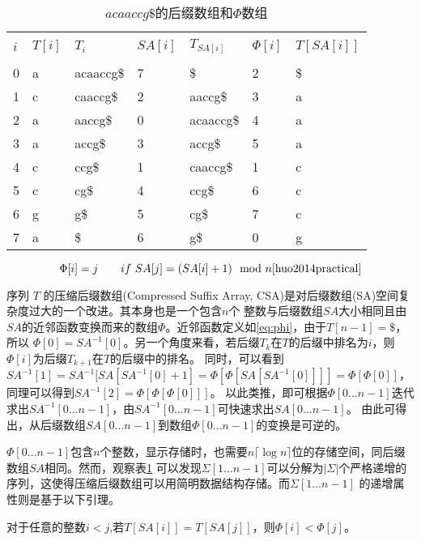 \begin{table}[htbp]
    \caption{$acaaccg\$$的后缀数组和$\Phi$数组}
    \label{tab:tabsuffix}
    \centering
    \begin{tabular}{lllllll}
        \hline\\
        $i$&$T[i]$&$T_i$&$SA[i]$&$T_{SA[i]}$&$\Phi[i]$&$T[SA[i]]$\\
        \hline\\
        0&a&acaaccg\$&7&\$&2&\$\\
        1&c&caaccg\$&2&aaccg\$&3&a\\
        2&a&aaccg\$&0&acaaccg\$&4&a\\
        3&a&accg\$&3&accg\$&5&a\\
        4&c&ccg\$&1&caaccg\$&1&c\\
        5&c&cg\$&4&ccg\$&6&c\\
        6&g&g\$&5&cg\$&7&c\\
        7&a&\$&6&g\$&0&g\\
        \hline
    \end{tabular}
\end{table}

\begin{equation}\label{eq:phi}
    \Phi [i] = j \qquad if\ SA[j] = (SA[i]+1)\mod n \cite{huo2014practical}
\end{equation}

序列 $T$ 的压缩后缀数组(Compressed Suffix Array, CSA)是对后缀数组(SA)空间复杂度过大的一个改进。其本身也是一个包含$n$个
整数与后缀数组$SA$大小相同且由$SA$的近邻函数变换而来的数组$\Phi$。近邻函数定义如\ref{eq:phi}，由于$T[n-1]=\$$，所以
$\Phi[0]=SA^{-1}[0]$。另一个角度来看，若后缀$T_k$在$T$的后缀中排名为$i$，则$\Phi[i]$为后缀$T_{k+1}$在$T$的后缀中的排名。
同时，可以看到$SA^{-1}[1]=SA^{-1}[SA[SA^{-1}[0]+1]=\Phi[\Phi[SA[SA^{-1}[0]]]]=\Phi[\Phi[0]]$，同理可以得到$SA^{-1}[2]=\Phi[\Phi[\Phi[0]]]$。
以此类推，即可根据$\Phi[0\ldots n-1]$迭代求出$SA^{-1}[0\ldots n-1]$，由$SA^{-1}[0\ldots n-1]$可快速求出$SA[0\ldots n-1]$。
由此可得出，从后缀数组$SA[0\ldots n-1]$到数组$\Phi[0\ldots n-1]$的变换是可逆的。

$\Phi[0\ldots n-1]$包含$n$个整数，显示存储时，也需要$n\lceil \log n \rceil$位的存储空间，同后缀数组$SA$相同。然而，观察表\ref{tab:tabsuffix}
可以发现$\Sigma[1\ldots n-1]$可以分解为$|\Sigma|$个严格递增的序列，这使得压缩后缀数组可以用简明数据结构存储。而$\Sigma[1\ldots n-1]$
的递增属性则是基于以下引理。

\begin{lem}\label{ref:lem1}
对于任意的整数$i<j$,若$T[SA[i]]=T[SA[j]]$，则$\Phi[i]<\Phi[j]$。
\end{lem}

